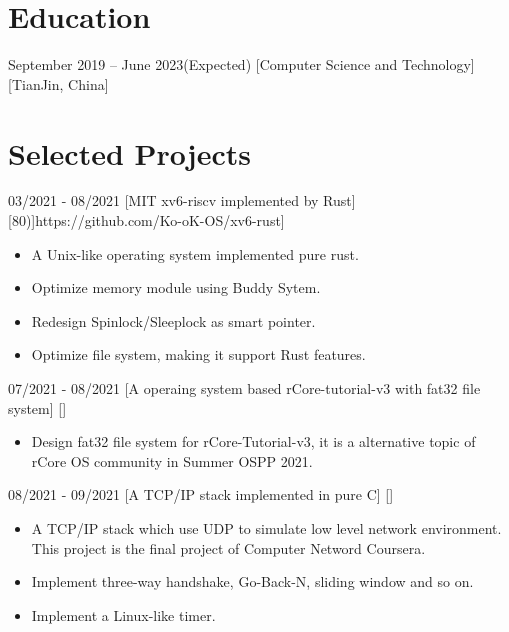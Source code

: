 \documentclass{chicv}
\begin{document}
\begin{basicinfo}
\end{basicinfo}

\section{Education}
  {September 2019 -- June 2023(Expected)}
  [Computer Science and Technology]
  [TianJin, China]



\section{Selected Projects}

  {03/2021 - 08/2021}
  [MIT xv6-riscv implemented by Rust]
  [\iconlink[\faGithub][Ko-oK/xv6-rust(\faIcon[regular]{star}80)]{https://github.com/Ko-oK-OS/xv6-rust}]
  \begin{itemize}
    \item A Unix-like operating system implemented pure rust. 
    \item Optimize memory module using Buddy Sytem.
    \item Redesign Spinlock/Sleeplock as smart pointer.
    \item Optimize file system, making it support Rust features.
  \end{itemize}

  {07/2021 - 08/2021}
  [A operaing system based rCore-tutorial-v3 with fat32 file system]
  []
  \begin{itemize}
    \item Design fat32 file system for rCore-Tutorial-v3, it is a alternative topic of rCore OS community in Summer OSPP 2021.
  \end{itemize}

  {08/2021 - 09/2021}
  [A TCP/IP stack implemented in pure C]
  []
  \begin{itemize}
    \item A TCP/IP stack which use UDP to simulate low level network environment. This project is the final project of Computer Netword Coursera.
    \item Implement three-way handshake, Go-Back-N, sliding window and so on.
    \item Implement a Linux-like timer.
  \end{itemize}
\end{document}
